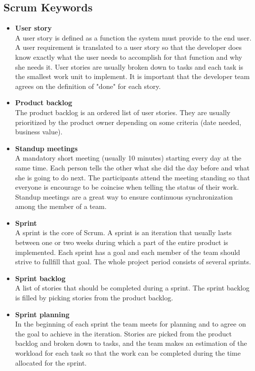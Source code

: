 \subsection{Scrum Keywords}
\begin{itemize}
\item{\textbf{User story}}\\
A user story is defined as a function the system must provide to the end user.
A user requirement is translated to a user story so that the developer does know exactly
what the user needs to accomplish for that function and why she needs it. User stories are usually
broken down to tasks and each task is the smallest work unit to implement.
It is important that the developer team agrees on the definition of "done" for each story.

\item{\textbf{Product backlog}}\\
The product backlog is an ordered list of user stories. They are usually prioritized by the product owner 
depending on some criteria (date needed, business value).

\item{\textbf{Standup meetings}}\\
A mandatory short meeting (usually 10 minutes) starting every day at the same time.
Each person tells the other what she did the day before and what she is going to do
next. The participants attend the meeting standing so that everyone is encourage to be coincise
when telling the status of their work. Standup meetings are a great way to ensure continuous
synchronization among the member of a team.

\item{\textbf{Sprint}}\\
A sprint is the core of Scrum. A sprint is an iteration that usually lasts between one or two weeks
during which a part of the entire product is implemented. Each sprint has a goal and each member of
the team should strive to fullfill that goal. The whole project period consists of several sprints.

\item{\textbf{Sprint backlog}}\\
A list of stories that should be completed during a sprint. The sprint backlog is filled by picking stories
from the product backlog.

\item{\textbf{Sprint planning}}\\
In the beginning of each sprint the team meets for planning and to agree on the goal to achieve in the iteration.
Stories are picked from the product backlog and broken down to tasks, and the team makes an estimation of the workload
for each task so that the work can be completed during the time allocated for the sprint.


\end{itemize}
